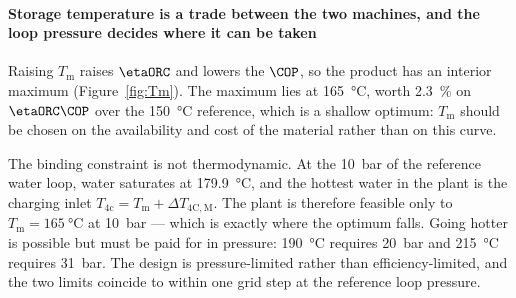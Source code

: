 %
%

\paragraph{Storage temperature is a trade between the two machines, and the
loop pressure decides where it can be taken} Raising $T_\mathrm{m}$ raises
$\etaORC$ and lowers the $\COP$, so the product has an interior maximum
(Figure~\ref{fig:Tm}). The maximum lies at \SI{165}{\celsius}, worth
\SI{2.3}{\percent} on $\etaORC\COP$ over the \SI{150}{\celsius} reference,
which is a shallow optimum: $T_\mathrm{m}$ should be chosen on the
availability and cost of the material rather than on this curve.

The binding constraint is not thermodynamic. At the \SI{10}{\bar} of the
reference water loop, water saturates at \SI{179.9}{\celsius}, and the
hottest water in the plant is the charging inlet
$T_\mathrm{4c}=T_\mathrm{m}+\Delta T_\mathrm{4C,M}$. The plant is therefore
feasible only to $T_\mathrm{m}=\SI{165}{\celsius}$ at \SI{10}{\bar} --- which
is exactly where the optimum falls. Going hotter is possible but must be paid
for in pressure: \SI{190}{\celsius} requires \SI{20}{\bar} and
\SI{215}{\celsius} requires \SI{31}{\bar}. The design is pressure-limited
rather than efficiency-limited, and the two limits coincide to within one
grid step at the reference loop pressure.

